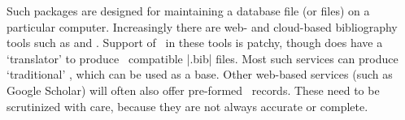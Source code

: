 Such packages are designed for maintaining a database file (or files) on a particular computer. Increasingly there are web- and cloud-based bibliography tools such as  and . Support of \biblatex\ in these tools is patchy, though  does have a `translator' to produce \biblatex\ compatible |.bib| files. Most such services can produce `traditional' \bibtex, which can be used as a base. Other web-based services (such as Google Scholar) will often also offer pre-formed \bibtex\ records. These need to be scrutinized with care, because they are not always accurate or complete.